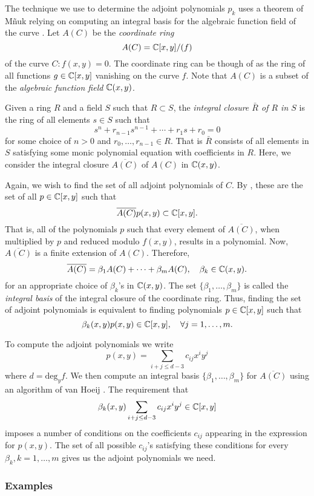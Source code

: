 The technique we use to determine the adjoint polynomials $p_k$ uses a
theorem of M\~{n}uk relying on computing an integral basis for the
algebraic function field of the curve \cite{Mnuk97}. Let $A(C)$ be the
{\it coordinate ring}
\[
    A(C) = \operatorname{\mathbb{C}}[x,y] / (f)
\]
of the curve $C : f(x,y) = 0$. The coordinate ring can be though of as
the ring of all functions $g \in \operatorname{\mathbb{C}}[x,y]$ vanishing on the curve
$f$. Note that $A(C)$ is a subset of the {\it algebraic function field}
$\operatorname{\mathbb{C}}(x,y)$.

Given a ring $R$ and a field $S$ such that $R \subset S$, the {\it
  integral closure $\bar{R}$ of $R$ in $S$} is the ring of all elements
$s \in S$ such that
\[
    s^n + r_{n-1}s^{n-1} + \cdots + r_1 s + r_0 = 0
\]
for some choice of $n >0$ and $r_0,\ldots,r_{n-1} \in R$. That is
$\bar{R}$ consists of all elements in $S$ satisfying some monic
polynomial equation with coefficients in $R$. Here, we consider the
integral closure $\overline{A(C)}$ of $A(C)$ in $\operatorname{\mathbb{C}}(x,y)$.

Again, we wish to find the set of all adjoint polynomials of $C$. By
\cite{Mnuk97}, these are the set of all $p \in \operatorname{\mathbb{C}}[x,y]$ such that
\[
    \overline{A(C)} p(x,y) \subset\operatorname{\mathbb{C}}[x,y].
\]
That is, all of the polynomials $p$ such that every element of
$\overline{A(C)}$, when multiplied by $p$ and reduced modulo $f(x,y)$,
results in a polynomial. Now, $\overline{A(C)}$ is a finite extension of
$A(C)$. Therefore,
\[
    \overline{A(C)} = \beta_1 A(C) + \cdots + \beta_m A(C),
    \quad
    \beta_k \in \operatorname{\mathbb{C}}(x,y).
\]
for an appropriate choice of $\beta_k$'s in $\operatorname{\mathbb{C}}(x,y)$. The set
$\{\beta_1,\ldots,\beta_m\}$ is called the {\it integral basis} of the
integral closure of the coordinate ring. Thus, finding the set of
adjoint polynomials is equivalent to finding polynomials $p \in
\operatorname{\mathbb{C}}[x,y]$ such that
\[
    \beta_k(x,y) p(x,y) \in \operatorname{\mathbb{C}}[x,y], \quad \forall j=1,\ldots,m.
\]

To compute the adjoint polynomials we write
\[
    p(x,y) = \sum_{i+j \leq d-3} c_{ij}x^iy^j
\]
where $d = \text{deg}_y f$. We then compute an integral basis
$\{\beta_1,\ldots,\beta_m\}$ for $\overline{A(C)}$ using an algorithm of
van Hoeij \cite{vanHoeij94}. The requirement that
\[
    \beta_k(x,y) \sum_{i+j \leq d-3} c_{ij}x^iy^j \in \operatorname{\mathbb{C}}[x,y]
\]
imposes a number of conditions on the coefficients $c_{ij}$ appearing in
the expression for $p(x,y)$. The set of all possible $c_{ij}$'s
satisfying these conditions for every $\beta_k, k=1,\ldots,m$ gives us
the adjoint polynomials we need.

%
\subsubsection*{Examples}
%

